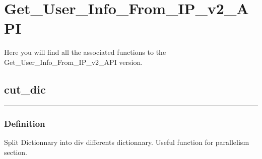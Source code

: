 \documentclass[letterpaper,10pt,english]{sphinxmanual}
\begin{document}
\begin{sphinxVerbatim}[commandchars=\\\{\}]
\end{sphinxVerbatim}

\sphinxstepscope


\chapter{Get\_User\_Info\_From\_IP\_v2\_API}
\label{\detokenize{Get_User_Info_From_IP_v2_API:get-user-info-from-ip-v2-api}}\label{\detokenize{Get_User_Info_From_IP_v2_API::doc}}
\sphinxAtStartPar
Here you will find all the associated functions to the Get\_User\_Info\_From\_IP\_v2\_API version.

\sphinxstepscope

\newpage
\section{cut\_dic}
\label{\detokenize{GUIFI/cut_dic:cut-dic}}\label{\detokenize{GUIFI/cut_dic::doc}}
\begin{sphinxVerbatim}[commandchars=\\\{\}]
 
\end{sphinxVerbatim}


\bigskip\hrule\bigskip



\subsection{Definition}
\label{\detokenize{GUIFI/cut_dic:definition}}
\sphinxAtStartPar
Split Dictionnary into div differents dictionnary.
Useful function for parallelism section.
\end{document}
